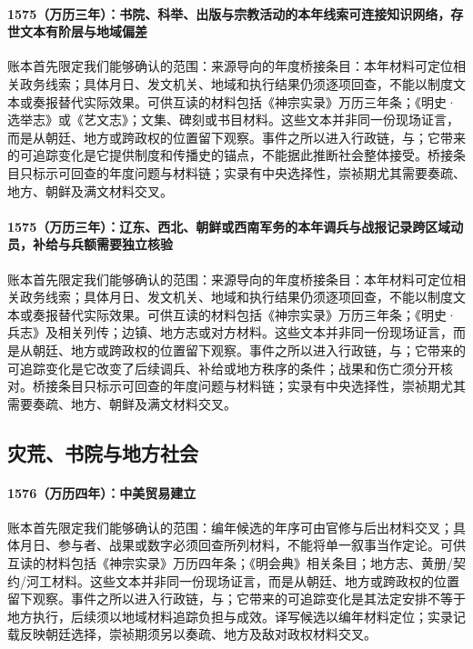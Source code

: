 \paragraph{1575（万历三年）：书院、科举、出版与宗教活动的本年线索可连接知识网络，存世文本有阶层与地域偏差} 账本首先限定我们能够确认的范围：来源导向的年度桥接条目：本年材料可定位相关政务线索；具体月日、发文机关、地域和执行结果仍须逐项回查，不能以制度文本或奏报替代实际效果。可供互读的材料包括《神宗实录》万历三年条；《明史·选举志》或《艺文志》；文集、碑刻或书目材料。这些文本并非同一份现场证言，而是从朝廷、地方或跨政权的位置留下观察。事件之所以进入行政链，与；它带来的可追踪变化是它提供制度和传播史的锚点，不能据此推断社会整体接受。桥接条目只标示可回查的年度问题与材料链；实录有中央选择性，崇祯期尤其需要奏疏、地方、朝鲜及满文材料交叉。

\paragraph{1575（万历三年）：辽东、西北、朝鲜或西南军务的本年调兵与战报记录跨区域动员，补给与兵额需要独立核验} 账本首先限定我们能够确认的范围：来源导向的年度桥接条目：本年材料可定位相关政务线索；具体月日、发文机关、地域和执行结果仍须逐项回查，不能以制度文本或奏报替代实际效果。可供互读的材料包括《神宗实录》万历三年条；《明史·兵志》及相关列传；边镇、地方志或对方材料。这些文本并非同一份现场证言，而是从朝廷、地方或跨政权的位置留下观察。事件之所以进入行政链，与；它带来的可追踪变化是它改变了后续调兵、补给或地方秩序的条件；战果和伤亡须分开核对。桥接条目只标示可回查的年度问题与材料链；实录有中央选择性，崇祯期尤其需要奏疏、地方、朝鲜及满文材料交叉。

\subsection{灾荒、书院与地方社会}

\paragraph{1576（万历四年）：中美贸易建立} 账本首先限定我们能够确认的范围：编年候选的年序可由官修与后出材料交叉；具体月日、参与者、战果或数字必须回查所列材料，不能将单一叙事当作定论。可供互读的材料包括《神宗实录》万历四年条；《明会典》相关条目；地方志、黄册/契约/河工材料。这些文本并非同一份现场证言，而是从朝廷、地方或跨政权的位置留下观察。事件之所以进入行政链，与；它带来的可追踪变化是其法定安排不等于地方执行，后续须以地域材料追踪负担与成效。译写候选以编年材料定位；实录记载反映朝廷选择，崇祯期须另以奏疏、地方及敌对政权材料交叉。

